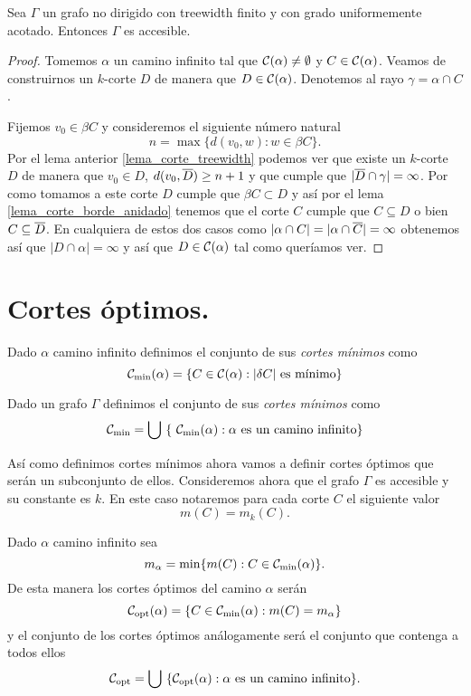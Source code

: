 \documentclass[tesis.tex]{subfiles}
\begin{document}
\begin{teo}\label{teo_treewidth_fin_accesible}
	Sea $\Gamma$ un grafo no dirigido con treewidth finito y con grado uniformemente acotado.
	Entonces $\Gamma$ es accesible.
\end{teo}
\begin{proof}
	Tomemos $\alpha$ un camino infinito tal que ${\cal C}(\alpha) \neq \emptyset$ y $C \in {\cal C}(\alpha)$.
	Veamos de construirnos un $k$-corte $D$ de manera que $D \in {\cal C}(\alpha)$.
	Denotemos al rayo $\gamma = \alpha \cap C$.
	
	Fijemos $v_0  \in \beta C$ y consideremos el siguiente número natural
	\[
	n = \max \{ d(v_0,w) : w \in \beta C  \}.
	\]
	Por el lema anterior \ref{lema_corte_treewidth} podemos ver que existe un $k$-corte $D$ de manera que $v_{0} \in D$, $d(v_0, \overline D) \ge n+1$ y que cumple que $|\overline D \cap \gamma| = \infty$.
	Por como tomamos a este corte $D$ cumple que $\beta C \subset D$ y así por el lema \ref{lema_corte_borde_anidado} tenemos que el corte $C$ cumple que 
	$C \subseteq D$ o bien $C \subseteq \overline D$.
	En cualquiera de estos dos casos como $|\alpha \cap C| = |\alpha \cap \overline  C| = \infty$ obtenemos así que $|D \cap \alpha|=\infty$ y así que $D \in {\cal C}(\alpha)$ tal como queríamos ver. 
	
\end{proof}


\section{Cortes óptimos.}

\begin{deff}
	Dado $\alpha$ camino infinito definimos el conjunto de sus \emph{cortes mínimos} como
	\[
	\cam = \{  C \in \ca : |\delta C| \ \text{es mínimo}  \}
	\]
	
	Dado un grafo $\Gamma$ definimos el conjunto de sus \emph{cortes mínimos} como 
	\[
	{\cal C}_{\text{min}} = \bigcup \ \{ \ {\cal C}_{\text{min}}(\alpha) : \alpha \ \text{es un camino infinito}  \}
	\]
\end{deff}


Así como definimos cortes mínimos ahora vamos a definir cortes óptimos que serán un subconjunto de ellos.
Consideremos ahora que el grafo $\Gamma$ es accesible y su constante es $k$.
En este caso notaremos para cada corte $C$ el siguiente valor
\[
m(C) = m_k(C).
\]




\begin{deff}
	Dado $\alpha$ camino infinito sea
	\[
		m_\alpha = \min \{ m(C) : C \in {\cal C}_{\text{min}}(\alpha) \}.
	\]
	De esta manera los cortes óptimos del camino $\alpha$ serán
	\[
		{\cal C}_{\text{opt}}(\alpha) = \{ C \in {\cal C}_{\text{min}}(\alpha) : m(C) = m_\alpha  \}
	\]
	y el conjunto de los cortes óptimos análogamente será el conjunto que contenga a todos ellos
	\[
		{\cal C}_{\text{opt}} = \bigcup \ \{ {\cal C}_{\text{opt}}(\alpha) : \alpha \ \text{es un camino infinito}  \}.
	\]
\end{deff}
\end{document}
